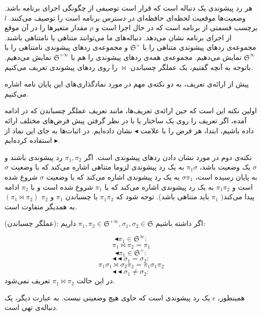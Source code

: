 هر رد پیشوندی یک دنباله است که قرار است توصیفی از چگونگی اجرای برنامه باشد. وضعیت‌ها موقعیت لحظه‌ای حافظه‌ا‌ی در دسترس برنامه است را توصیف می‌کنند. $l$ برچسب قسمتی از برنامه‌ است که در حال اجرا است و $\rho$ مقدار متغیر‌ها را در آن موقع از اجرای برنامه نشان می‌دهد. دنباله‌های ما می‌توانند متناهی یا نامتناهی باشند. مجموعه‌ی ردهای پیشوندی‌ متناهی را با $\mathfrak{S^+}$ و مجموعه‌ی ردهای پیشوندی نامتناهی را با  $\mathfrak{S^\infty}$ نمایش می‌دهیم. مجموعه‌ی همه‌ی ردهای پیشوندی را هم با $\mathfrak{S^{+\infty}}$ نمایش می‌دهیم. 
با‌توجه به آنچه گفتیم، یک عملگر چسباندن $\Join$ را روی ردهای پیشوندی تعریف می‌کنیم. 

پیش از ارائه‌ی تعریف، به دو نکته‌ی مهم در مورد نمادگذاری‌های این پایان نامه اشاره می‌کنیم.

اولین نکته این است که حین ارائه‌ی تعریف‌ها، مانند تعریف عملگر چسباندن که در ادامه آمده، اگر تعریف را روی یک ساختار یا با در نظر گرفتن پیش فرض‌های مختلف ارائه داده باشیم، ابتدا، هر فرض را با علامت 
$\blacktriangleleft$
نشان داده‌ایم. در اثبات‌ها به جای این نماد از 
$\blacktriangleright$
استفاده کرده‌ایم. 

نکته‌ی دوم در مورد نشان دادن ردهای پیشوندی است. اگر $\pi_1,\pi_2$ رد پیشوندی باشند و $\sigma$ یک وضعیت باشد، $\pi_1\sigma$ به یک رد پیشوندی لزوما متناهی اشاره می‌کند که با وضعیت $\sigma$ به پایان رسیده است،
 $\sigma\pi_1$
به یک رد پیشوندی اشاره می‌کند که با وضعیت $\sigma$ شروع شده است و $\pi_1\pi_2$ به یک رد پیشوندی اشاره می‌کند که با $\pi_1$ شروع شده است و با $\pi_2$ ادامه پیدا می‌کند( $\pi_1$ باید متناهی باشد). توجه شود که $\pi_1\pi_2$ با چسباندن $\pi_1$ و $\pi_2$ $(\pi_1 \Join \pi_2)$به همدیگر متفاوت است.

\begin{defn}
	(عملگر چسباندن): اگر داشته باشیم 
	$\pi_1 , \pi_2 \in \mathfrak{S^{+\infty}}  , \sigma_1 ,\sigma_2 \in \mathfrak{S}$
	داریم:\\
	\begin{center}
		
		$$\blacktriangleleft \pi_1 \in \mathfrak{S}^\infty:$$
		$$\pi_1 \Join \pi_2 = \pi_1$$
		$$\blacktriangleleft \pi_1 \in \mathfrak{S}^+:$$
		$$\blacktriangleleft \blacktriangleleft \sigma_1 = \sigma_2:$$
		$$\pi_1\sigma_1 \Join \sigma_2 \pi_2 = \pi_1 \sigma_1 \pi_2$$
		$$\blacktriangleleft \blacktriangleleft \sigma_1 \neq \sigma_2:$$
		در این حالت 
		$\pi_1 \Join \pi_2$
		تعریف نمی‌شود.
	\end{center}
\end{defn}
همینطور، $\epsilon$ یک رد پیشوندی است که حاوی هیچ وضعیتی نیست. به عبارت دیگر، یک دنباله‌ی تهی است.


